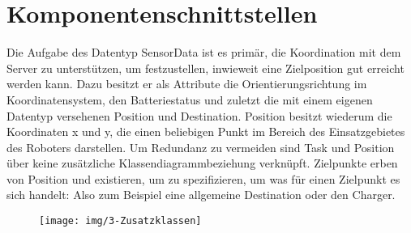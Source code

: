 \section{Komponentenschnittstellen}
Die Aufgabe des Datentyp SensorData ist es primär, die Koordination mit dem Server zu unterstützen, um festzustellen, inwieweit eine Zielposition gut erreicht werden kann. Dazu besitzt er als Attribute die Orientierungsrichtung im Koordinatensystem, den Batteriestatus und zuletzt die mit einem eigenen Datentyp versehenen Position und Destination. Position besitzt wiederum die Koordinaten x und y, die einen beliebigen Punkt im Bereich des Einsatzgebietes des Roboters darstellen. Um Redundanz zu vermeiden sind Task und Position über keine zusätzliche Klassendiagrammbeziehung verknüpft. Zielpunkte erben von Position und existieren, um zu spezifizieren, um was für einen Zielpunkt es sich handelt: Also zum Beispiel eine allgemeine Destination oder den Charger.
	
	\begin{figure}[H]
		\centering
		\texttt{[image: img/3-Zusatzklassen]}
		\label{Komponentenschnittstellen}
	\end{figure}
